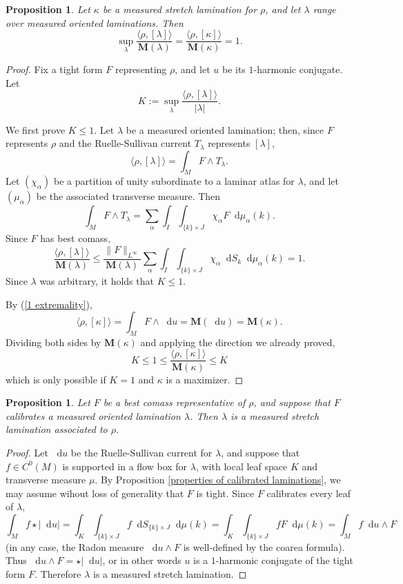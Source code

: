 \documentclass[reqno,11pt]{amsart}
\newcommand*\dif{\mathop{}\!\mathrm{d}}
\newcommand{\Mass}{\mathbf M}
\newtheorem{proposition}[theorem]{Proposition}
\theoremstyle{definition}
\numberwithin{equation}{section}
\begin{document}
\begin{proposition}\label{L equals K}
	Let $\kappa$ be a measured stretch lamination for $\rho$, and let $\lambda$ range over measured oriented laminations. Then 
	\begin{equation}\label{L equals K formula}
	\sup_\lambda \frac{\langle \rho, [\lambda]\rangle}{\Mass(\lambda)} = \frac{\langle \rho, [\kappa]\rangle}{\Mass(\kappa)} = 1.
	\end{equation}
\end{proposition}
\begin{proof}
Fix a tight form $F$ representing $\rho$, and let $u$ be its $1$-harmonic conjugate.
Let
$$K :=  \sup_\lambda \frac{\langle \rho, [\lambda]\rangle}{|\lambda|}.$$

We first prove $K \leq 1$.
Let $\lambda$ be a measured oriented lamination; then, since $F$ represents $\rho$ and the Ruelle-Sullivan current $T_\lambda$ represents $[\lambda]$,
$$\langle \rho, [\lambda]\rangle = \int_M F \wedge T_\lambda.$$
Let $(\chi_\alpha)$ be a partition of unity subordinate to a laminar atlas for $\lambda$, and let $(\mu_\alpha)$ be the associated transverse measure. Then 
$$\int_M F \wedge T_\lambda = \sum_\alpha \int_I \int_{\{k\} \times J} \chi_\alpha F \dif \mu_\alpha(k).$$
Since $F$ has best comass,
$$\frac{\langle \rho, [\lambda] \rangle}{\Mass(\lambda)}
\leq \frac{\|F\|_{L^\infty}}{\Mass(\lambda)} \sum_\alpha \int_I \int_{\{k\} \times J} \chi_\alpha \dif S_k \dif \mu_\alpha(k) = 1.$$
Since $\lambda$ was arbitrary, it holds that $K \leq 1$.

By (\ref{1 extremality}),
$$\langle \rho, [\kappa]\rangle = \int_M F \wedge \dif u = \Mass(\dif u) = \Mass(\kappa).$$
Dividing both sides by $\Mass(\kappa)$ and applying the direction we already proved,
$$K \leq 1 \leq \frac{\langle \rho, [\kappa]\rangle}{\Mass(\kappa)} \leq K$$
which is only possible if $K = 1$ and $\kappa$ is a maximizer.
\end{proof}

\begin{proposition}\label{calibrated means measured stretch}
Let $F$ be a best comass representative of $\rho$, and suppose that $F$ calibrates a measured oriented lamination $\lambda$.
Then $\lambda$ is a measured stretch lamination associated to $\rho$.
\end{proposition}
\begin{proof}
Let $\dif u$ be the Ruelle-Sullivan current for $\lambda$, and suppose that $f \in C^0(M)$ is supported in a flow box for $\lambda$, with local leaf space $K$ and transverse measure $\mu$.
By Proposition \ref{properties of calibrated laminations}, we may assume wihout loss of generality that $F$ is tight.
Since $F$ calibrates every leaf of $\lambda$,
$$\int_M f \star |\dif u| = \int_K \int_{\{k\} \times J} f \dif S_{\{k\} \times J} \dif \mu(k) = \int_K \int_{\{k\} \times J} fF \dif \mu(k) = \int_M f\dif u \wedge F$$
(in any case, the Radon measure $\dif u \wedge F$ is well-defined by the coarea formula).
Thus $\dif u \wedge F = \star |\dif u|$, or in other words $u$ is a $1$-harmonic conjugate of the tight form $F$.
Therefore $\lambda$ is a measured stretch lamination.
\end{proof}
\end{document}
